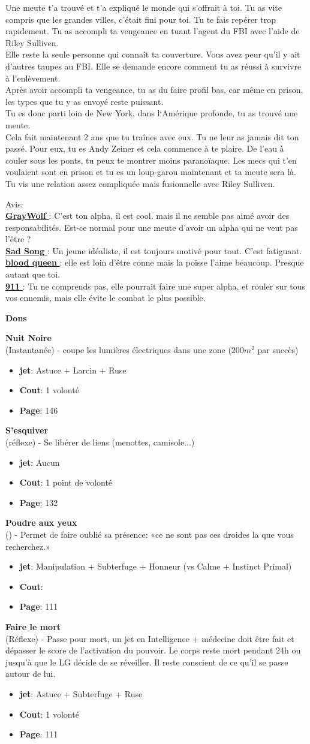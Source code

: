 \documentclass[oneside,12pt]{book}
\newcommand\don[6]{
\textbf{#1} \\
(#6) - #2
\begin{itemize}
\item{ \textbf{jet}: #3}
\item{ \textbf{Cout}: #4}
\item{ \textbf{Page}: #5}
\end{itemize}
\vspace{0.5cm}
}
\newcommand{\Glen}{\textbf{GrayWolf} }
\newcommand{\Mathew}{\textbf{Sad Song} }
\newcommand{\Laura}{\textbf{blood queen} }
\newcommand{\Kelly}{\textbf{911} }
\begin{document}
\begin{flushleft}
\begin{description}
{{ Une meute t'a trouvé et t'a expliqué le monde qui s'offrait à toi.
Tu as vite compris que les grandes villes, c'était fini pour toi. Tu te fais repérer trop rapidement. Tu as accompli ta vengeance en tuant l'agent du FBI avec l'aide de Riley Sulliven.\\
Elle reste la seule personne qui connaît ta couverture. Vous avez peur qu'il y ait d'autres taupes au FBI. Elle se demande encore comment tu as réussi à survivre à l'enlèvement. \\
Après avoir accompli ta vengeance, tu as du faire profil bas, car même en prison, les types que tu y as envoyé reste puissant.\\ Tu es donc parti loin de New York, dans l`Amérique profonde, tu as trouvé une meute.\\
Cela fait maintenant 2 ans que tu traînes avec eux. Tu ne leur as jamais dit ton passé. Pour eux, tu es Andy Zeiner et cela commence à te plaire. De l'eau à couler sous les ponts, tu peux te montrer moins paranoïaque. Les mecs qui t'en voulaient sont en prison et tu es un loup-garou maintenant et ta meute sera là.\\
Tu vis une relation assez compliquée mais fusionnelle avec Riley Sulliven. }


Avis:\\
\underline{\Glen} :  C'est ton alpha, il est cool. mais il ne semble pas aimé avoir des responsabilités. Est-ce normal pour une meute d'avoir un alpha qui ne veut pas l'être ?\\
\underline{\Mathew} : Un jeune idéaliste, il est toujours motivé pour tout. C'est fatiguant.\\
\underline{\Laura} : elle est loin d'être conne mais la poisse l'aime beaucoup. Presque autant que toi. \\
\underline{\Kelly}: Tu ne comprends pas, elle pourrait faire une super alpha, et rouler sur tous vos ennemis, mais elle évite le combat le plus possible.\\
}
\end{description}
\clearpage
\textbf{\large Dons}
\vspace{0.5cm}

\don{Nuit Noire}{coupe les lumières électriques dans une zone (\begin{math}200m^2\end{math} par succès)}{Astuce + Larcin + Ruse}{1 volonté}{146}{Instantanée}
\don{S'esquiver}{Se libérer de liens (menottes, camisole...)}{Aucun}{1 point de volonté}{132}{réflexe}
\don{Poudre aux yeux}{Permet de faire oublié sa présence: «ce ne sont pas ces droides la que vous recherchez.»}{Manipulation + Subterfuge + Honneur (vs Calme + Instinct Primal)}{}{111}{}
\don{Faire le mort}{Passe pour mort, un jet en Intelligence + médecine doit être fait et dépasser le score de l'activation du pouvoir. Le corps reste mort pendant 24h ou jusqu'à que le LG décide de se réveiller. Il reste conscient de ce qu'il se passe autour de lui.}{Astuce + Subterfuge + Ruse}{1 volonté}{111}{Réflexe}


\end{flushleft}
\end{document}
